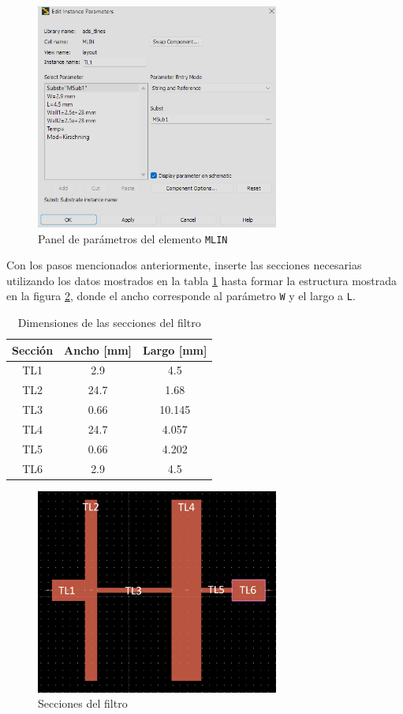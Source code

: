 \begin{figure}[!ht]
    \centering
    \includegraphics[width=8cm]{figures/metodologia/metologia2.png}
    \caption{Panel de parámetros del elemento \texttt{MLIN}}
    \label{fig:metologia_mlin_dimensiones}
\end{figure}

Con los pasos mencionados anteriormente, inserte las secciones necesarias utilizando los datos mostrados en la tabla \ref{table:metodologia_dimensiones} hasta formar la estructura mostrada en la figura \ref{fig:metologia_secciones_filtro}, donde el ancho corresponde al parámetro \texttt{W} y el largo a \texttt{L}.

\begin{table}[!ht]
\centering
\caption{Dimensiones de las secciones del filtro}
\label{table:metodologia_dimensiones}
\begin{tabular}{|c|c|c|}
\hline
Sección & Ancho {[}mm{]} & Largo {[}mm{]} \\ \hline
TL1     & 2.9            & 4.5            \\ \hline
TL2     & 24.7           & 1.68           \\ \hline
TL3     & 0.66           & 10.145         \\ \hline
TL4     & 24.7           & 4.057          \\ \hline
TL5     & 0.66           & 4.202          \\ \hline
TL6     & 2.9            & 4.5            \\ \hline
\end{tabular}
\end{table}

\begin{figure}[!ht]
    \centering
    \includegraphics[width=8cm]{figures/metodologia/metologia3.png}
    \caption{Secciones del filtro}
    \label{fig:metologia_secciones_filtro}
\end{figure}

